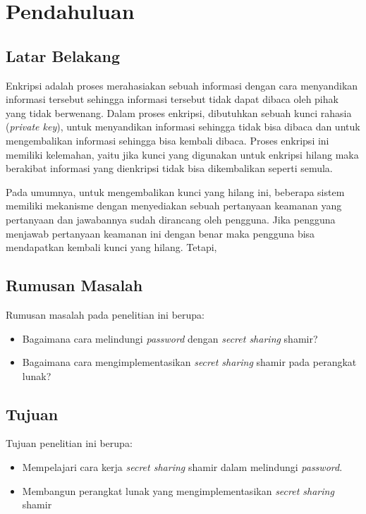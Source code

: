 \chapter{Pendahuluan}
\label{chap:Pendahuluan}

\section{\textbf{Latar Belakang}}
\label{sec:latar belakang}

Enkripsi adalah proses merahasiakan sebuah informasi dengan cara menyandikan informasi tersebut sehingga informasi tersebut tidak dapat dibaca oleh pihak yang tidak berwenang. Dalam proses enkripsi, dibutuhkan sebuah kunci rahasia (\textit{private key}), untuk menyandikan informasi sehingga tidak bisa dibaca dan untuk mengembalikan informasi sehingga bisa kembali dibaca. Proses enkripsi ini memiliki kelemahan, yaitu jika kunci yang digunakan untuk enkripsi hilang maka  berakibat informasi yang dienkripsi tidak bisa dikembalikan seperti semula.

Pada umumnya, untuk mengembalikan kunci yang hilang ini, beberapa sistem memiliki mekanisme dengan menyediakan sebuah pertanyaan keamanan yang pertanyaan dan jawabannya sudah dirancang oleh pengguna. Jika pengguna menjawab pertanyaan keamanan ini dengan benar maka pengguna bisa mendapatkan kembali kunci yang hilang. Tetapi, 

\section{\textbf{Rumusan Masalah}}
\label{sec:rumusan masalah}

Rumusan masalah pada penelitian ini berupa:
\begin{itemize}
	\item Bagaimana cara melindungi \textit{password} dengan \textit{secret sharing} shamir?
	\item Bagaimana cara mengimplementasikan {\it secret sharing} shamir pada perangkat lunak?
\end{itemize}

\section{\textbf{Tujuan}}
\label{sec:tujuan}

Tujuan penelitian ini berupa:
\begin{itemize}
	\item Mempelajari cara kerja {\it secret sharing} shamir dalam melindungi {\it password}.
	\item Membangun perangkat lunak yang mengimplementasikan {\it secret sharing} shamir
\end{itemize}

